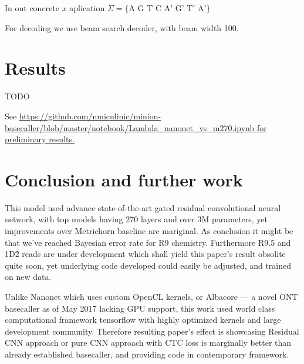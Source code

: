 \documentclass[times, utf8, seminar, numeric]{fer}
\begin{document}
In out concrete $x$ aplication $\Sigma = \{\text{A G T C A' G' T' A'}\}$

For decoding we use beam search decoder, with beam width 100.

\chapter{Results}

TODO

See \url{https://github.com/nmiculinic/minion-basecaller/blob/master/notebook/Lambda_nanonet_vs_m270.ipynb for preliminary results.}

\chapter{Conclusion and further work}

This model used advance state-of-the-art gated residual convolutional neural network, with top models having 270 layers and over 3M parameters, yet improvements over Metrichorn baseline are mariginal. As conclusion it might be that we've reached Bayesian error rate for R9 chemistry. Furthermore R9.5 and 1D\^2 reads are under development which shall yield this paper's result obsolite quite soon, yet underlying code developed could easily be adjusted, and trained on new data.

Unlike Nanonet which uses custom OpenCL kernels, or Albacore --- a novel ONT basecaller as of May 2017 lacking GPU support, this work used world class computational framework tensorflow with highly optimized kernels and large development community. Therefore resulting paper's effect is showcasing Residual CNN approach or pure CNN approach with CTC loss is marginally better than already established basecaller, and providing code in contemporary framework.



\end{document}
